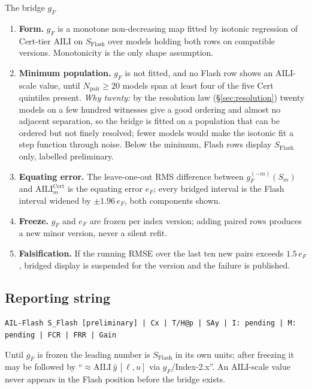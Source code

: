 \documentclass[11pt]{article}
\theoremstyle{definition}
\begin{document}
\begin{claimbox}{The bridge $g_F$}
\begin{enumerate}[leftmargin=1.4em,itemsep=2pt]
\item \textbf{Form.} $g_F$ is a monotone non-decreasing map fitted by isotonic regression of Cert-tier AILI on $S_{\mathrm{Flash}}$ over models holding both rows on compatible versions. Monotonicity is the only shape assumption.
\item \textbf{Minimum population.} $g_F$ is not fitted, and no Flash row shows an AILI-scale value, until $N_{\text{pair}} \ge 20$ models span at least four of the five Cert quintiles present. \emph{Why twenty:} by the resolution law (\S\ref{sec:resolution}) twenty models on a few hundred witnesses give a good ordering and almost no adjacent separation, so the bridge is fitted on a population that can be ordered but not finely resolved; fewer models would make the isotonic fit a step function through noise. Below the minimum, Flash rows display $S_{\mathrm{Flash}}$ only, labelled preliminary.
\item \textbf{Equating error.} The leave-one-out RMS difference between $g_F^{(-m)}(S_m)$ and $\mathrm{AILI}_m^{\mathrm{Cert}}$ is the equating error $e_F$; every bridged interval is the Flash interval widened by $\pm 1.96\,e_F$, both components shown.
\item \textbf{Freeze.} $g_F$ and $e_F$ are frozen per index version; adding paired rows produces a new minor version, never a silent refit.
\item \textbf{Falsification.} If the running RMSE over the last ten new pairs exceeds $1.5\,e_F$, bridged display is suspended for the version and the failure is published.
\end{enumerate}
\end{claimbox}

\subsection{Reporting string}
\begin{center}\small
\texttt{AIL-Flash S\_Flash [preliminary] | Cx | T/H@p | SAy | I: pending | M: pending | FCR | FRR | Gain}
\end{center}
Until $g_F$ is frozen the leading number is $S_{\mathrm{Flash}}$ in its own units; after freezing it may be followed by ``$\approx\mathrm{AILI}\ \hat y\,[\ell, u]$ via $g_F$/Index-2.x''. An AILI-scale value never appears in the Flash position before the bridge exists.
\end{document}

